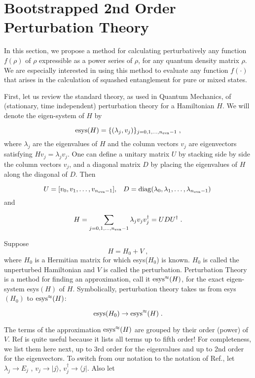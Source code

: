 \documentclass[12pt]{article}%
\newcommand{\bra}[1]{\langle#1|}
\newcommand{\ket}[1]{|#1\rangle}
\newcommand{\beq}{\begin{equation}}
\newcommand{\eeq}{\end{equation}}
\newcommand{\rarrow}[0]{\rightarrow}
\newcommand{\lam}[0]{\lambda}
\newcommand{\nev}[0]{{n_{\rm eva}}}
\begin{document}
\section{Bootstrapped 2nd Order Perturbation Theory}

In this section, we
propose a method for calculating perturbatively
any function $f(\rho)$ of $\rho$
 expressible
as a power series of $\rho$, for any quantum density
matrix $\rho$. We are especially interested
in using this method
to evaluate any function  $f(\cdot)$
that arises in the calculation of
squashed entanglement for pure or mixed states.

First, let us review the standard theory,
as used in Quantum Mechanics, of
(stationary, time independent)
 perturbation theory for a Hamiltonian $H$.
 We will denote the eigen-system
 of $H$ by

\beq
{\rm esys}(H) = \{ (\lam_j, v_j)\}_{j=0, 1, ..., \nev-1}
\;,
\eeq
where $\lam_j$ are the
eigenvalues of $H$ and the column vectors $v_j$
are eigenvectors satisfying $Hv_j = \lam_jv_j$.
One can define a unitary matrix $U$
by stacking
side by side the column vectors $v_j$,
and a diagonal matrix $D$
by placing the eigenvalues of
$H$ along the diagonal of $D$. Then

\beq
U = [ v_0, v_1, \ldots, v_{\nev-1}],\;\;\;
D = {\rm diag}(\lam_0, \lam_1, \ldots, \lam_{\nev-1})
\;
\eeq
and

\beq
H = \sum_{j=0, 1, ..., \nev-1} \lam_j v_jv^\dag_j
= UDU^\dag
\;.
\eeq

Suppose
\beq H = H_0 + V
\;,
\eeq
where $H_0$ is a Hermitian matrix for which esys($H_0$)
is known. $H_0$ is called the unperturbed
Hamiltonian and $V$ is called
the perturbation.  Perturbation
Theory is a method for finding an
approximation, call it ${\rm esys}^\approx(H)$,
for the exact eigen-system esys$(H)$ of $H$.
Symbolically, perturbation theory
takes us from esys$(H_0)$
to ${\rm esys}^\approx(H)$:


\beq
{\rm esys}(H_0) \rarrow {\rm esys}^\approx(H)
\;.
\eeq


The terms of the approximation ${\rm esys}^\approx(H)$
are grouped by their order (power) of $V$.
Ref\cite{pert-wiki} is quite useful because
it lists all terms up to fifth order!
 For completeness, we
list them here next,
up to 3rd order for the eigenvalues
and up to 2nd order for the eigenvectors.
To switch from our notation to the notation
of Ref.\cite{pert-wiki}, let
$\lam_j \rarrow E_j$ , $v_j\rarrow \ket{j}$,
$v_j^\dag \rarrow \bra{j}$. Also let
\end{document}
